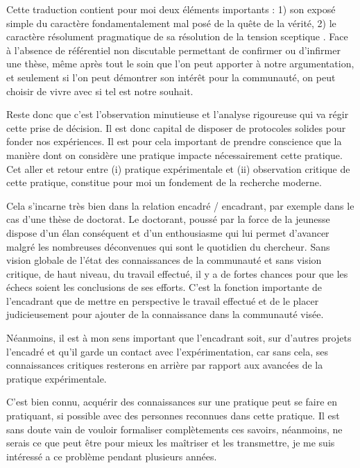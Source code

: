 Cette traduction contient pour moi deux éléments importants : 1) son exposé simple du caractère fondamentalement mal posé de la quête de la vérité, 2) le caractère résolument pragmatique de sa résolution de la \og tension sceptique \fg. Face à l'absence de référentiel non discutable permettant de confirmer ou d'infirmer une thèse, même après tout le soin que l'on peut apporter à notre argumentation, et seulement si l'on peut démontrer son intérêt pour la communauté, on peut choisir de vivre avec si tel est notre souhait.

Reste donc que c'est l'observation minutieuse et l'analyse rigoureuse qui va régir cette prise de décision. Il est donc capital de disposer de protocoles solides pour fonder nos expériences. Il est pour cela important de prendre conscience que la manière dont on considère une pratique impacte nécessairement cette pratique. Cet aller et retour entre (i) pratique expérimentale et (ii) observation critique de cette pratique, constitue pour moi un fondement de la recherche moderne.

Cela s'incarne très bien dans la relation encadré / encadrant, par exemple dans le cas d'une thèse de doctorat. Le doctorant, poussé par la force de la jeunesse dispose d'un élan conséquent et d'un enthousiasme qui lui permet d'avancer malgré les nombreuses déconvenues qui sont le quotidien du chercheur. Sans vision globale de l'état des connaissances de la communauté et sans vision critique, de haut niveau, du travail effectué, il y a de fortes chances pour que les échecs soient les conclusions de ses efforts. C'est la fonction importante de l'encadrant que de mettre en perspective le travail effectué et de le placer judicieusement pour ajouter de la connaissance dans la communauté visée.

Néanmoins, il est à mon sens important que l'encadrant soit, sur d'autres projets l'encadré et qu'il garde un contact avec l'expérimentation, car sans cela, ses connaissances critiques resterons en arrière par rapport aux avancées de la pratique expérimentale.

C'est bien connu, acquérir des connaissances sur une pratique peut se faire en pratiquant, si possible avec des personnes reconnues dans cette pratique. Il est sans doute vain de vouloir formaliser complètements ces savoirs, néanmoins, ne serais ce que peut être pour mieux les maîtriser et les transmettre, je me suis intéressé a ce problème pendant plusieurs années.

